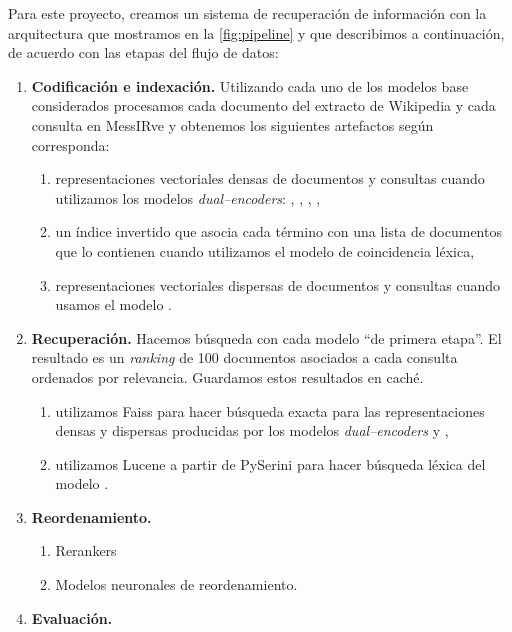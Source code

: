 Para este proyecto, creamos un sistema de recuperación de información con la arquitectura que mostramos en la \cref{fig:pipeline} y que describimos a continuación, de acuerdo con las etapas del flujo de datos:
\begin{enumerate}
	\item \textbf{Codificación e indexación.} Utilizando cada uno de los modelos base considerados procesamos cada documento del extracto de Wikipedia y cada consulta en MessIRve y obtenemos los siguientes artefactos según corresponda:
	\begin{enumerate}
		\item representaciones vectoriales densas de documentos y consultas cuando utilizamos los modelos \textit{dual--encoders}: , , , ,
		\item un índice invertido que asocia cada término con una lista de documentos que lo contienen cuando utilizamos el modelo  de coincidencia léxica,
		\item representaciones vectoriales dispersas de documentos y consultas cuando usamos el modelo .
	\end{enumerate}
	\item \textbf{Recuperación.} Hacemos búsqueda con cada modelo ``de primera etapa''. El resultado es un \textit{ranking} de 100 documentos asociados a cada consulta ordenados por relevancia. Guardamos estos resultados en caché.
	\begin{enumerate}
		\item utilizamos Faiss \parencite{faiss-JohnsonEtAl2019} para hacer búsqueda exacta para las representaciones densas y dispersas producidas por los modelos \textit{dual--encoders} y ,
		\item utilizamos Lucene \parencite{lucene-ApacheSoftwareFoundation2023} a partir de PySerini \parencite{pyserini-LinEtAl2021} para hacer búsqueda léxica del modelo .
	\end{enumerate}
	\item \textbf{Reordenamiento.} 
	\begin{enumerate}
		\item Rerankers
		\item Modelos neuronales de reordenamiento.
	\end{enumerate}
	\item \textbf{Evaluación.} 
\end{enumerate}


